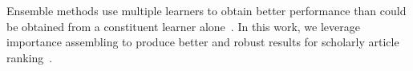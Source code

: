 
Ensemble methods use multiple learners to obtain better performance than could be obtained from a constituent learner alone~\cite{zhihua-book}.
In this work, we leverage  importance assembling  to produce better and robust results for scholarly article ranking~\cite{zhihua-book,wsdmcup,DuanAMHH16}.
